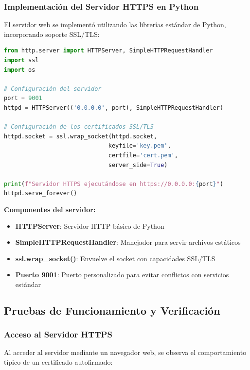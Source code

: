 \documentclass[12pt,a4paper]{article}
\begin{document}
\subsubsection{Implementación del Servidor HTTPS en Python}

El servidor web se implementó utilizando las librerías estándar de Python,
incorporando soporte SSL/TLS:

\begin{lstlisting}[language=python, caption=Servidor HTTPS con certificados SSL/TLS]
from http.server import HTTPServer, SimpleHTTPRequestHandler
import ssl
import os

# Configuración del servidor
port = 9001
httpd = HTTPServer(('0.0.0.0', port), SimpleHTTPRequestHandler)

# Configuración de los certificados SSL/TLS
httpd.socket = ssl.wrap_socket(httpd.socket,
                              keyfile='key.pem',
                              certfile='cert.pem',
                              server_side=True)

print(f"Servidor HTTPS ejecutándose en https://0.0.0.0:{port}")
httpd.serve_forever()
\end{lstlisting}

\textbf{Componentes del servidor:}

\begin{itemize}
  \item \textbf{HTTPServer}: Servidor HTTP básico de Python
  \item \textbf{SimpleHTTPRequestHandler}: Manejador para servir archivos estáticos
  \item \textbf{ssl.wrap\_socket()}: Envuelve el socket con capacidades SSL/TLS
  \item \textbf{Puerto 9001}: Puerto personalizado para evitar conflictos con servicios estándar
\end{itemize}

\subsection{Pruebas de Funcionamiento y Verificación}

\subsubsection{Acceso al Servidor HTTPS}

Al acceder al servidor mediante un navegador web, se observa el comportamiento
típico de un certificado autofirmado:
\end{document}
